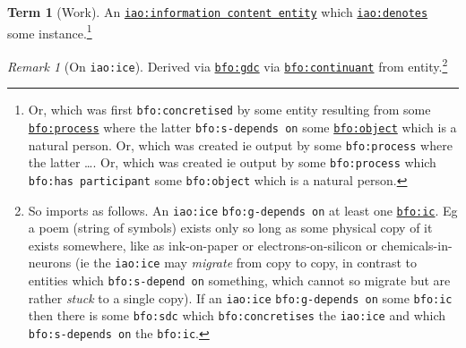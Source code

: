 \documentclass{amsart}%
\newcommand{\code}[1]{\texttt{#1}}%
\newcommand{\mention}[1]{\textit{#1}}%
\theoremstyle{plain}
\theoremstyle{definition}
\theoremstyle{remark}
\theoremstyle{definition}
\newtheorem{term}{Term}[subsection]%
\theoremstyle{remark}
\newtheorem*{term-note}{Remark}
\begin{document}
\begin{term}[Work]
\label{term:work}
An \href{http://purl.obolibrary.org/obo/IAO_0000030}{\code{iao:information content entity}} which \href{http://purl.obolibrary.org/obo/IAO_0000219}{\code{iao:denotes}} some instance.\footnote{Or, which was first \code{bfo:concretised} by some entity resulting from some \href{http://purl.obolibrary.org/obo/BFO_0000015}{\code{bfo:process}} where the latter \code{bfo:s-depends on} some \href{http://purl.obolibrary.org/obo/BFO_0000030}{\code{bfo:object}} which is a natural person. Or, which was created ie output by some \code{bfo:process} where the latter \ldots. Or, which was created ie output by some \code{bfo:process} which \code{bfo:has participant} some \code{bfo:object} which is a natural person.}%
\begin{term-note}[On \code{iao:ice}]
Derived via \href{http://purl.obolibrary.org/obo/BFO_0000031}{\code{bfo:gdc}} via \href{http://purl.obolibrary.org/obo/BFO_0000002}{\code{bfo:continuant}} from entity.\footnote{So imports as follows. An \code{iao:ice} \code{bfo:g-depends on} at least one \href{http://purl.obolibrary.org/obo/BFO_0000004}{\code{bfo:ic}}. Eg a poem (string of symbols) %
%
%
exists only so long as some physical copy of it exists somewhere, like as ink-on-paper or electrons-on-silicon or chemicals-in-neurons (ie the \code{iao:ice} may \mention{migrate} from copy to copy, in contrast to entities which \code{bfo:s-depend on} something, which cannot so migrate but are rather \mention{stuck} to a single copy). If an \code{iao:ice} \code{bfo:g-depends on} some \code{bfo:ic} then there is some \code{bfo:sdc} which \code{bfo:concretises} the \code{iao:ice} and which \code{bfo:s-depends on} the \code{bfo:ic}. %
}
\end{term-note}
\end{term}
\end{document}
